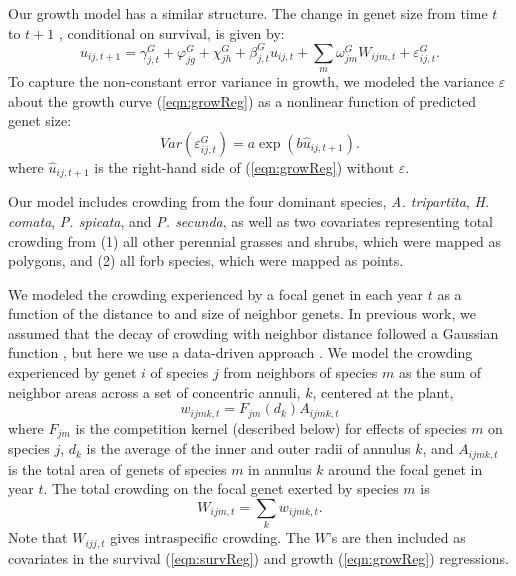 \documentclass[11pt]{article}
\begin{document}
\begin{doublespacing}
Our growth model has a similar structure. The change in genet size from time $t$ to $t+1$ , conditional on survival, is given by:
\begin{equation}
u_{ij,t+1} = \gamma_{j,t}^G + \varphi_{jg}^G+  \chi_{jh}^G  + \beta_{j,t}^G u_{ij,t} + 
\sum \limits_{m} \omega_{jm}^G {W}_{ijm,t} + \varepsilon_{ij,t}^G .
\label{eqn:growReg}
\end{equation}
To capture the non-constant error variance in growth, we modeled the variance $\varepsilon$ about the growth 
curve (\ref{eqn:growReg}) as a nonlinear function of predicted genet size:
\begin{equation}
Var(\varepsilon_{ij,t}^G) = a \exp(b\hat{u}_{ij,t+1}).
\label{eqn:growVar}
\end{equation}
where $\hat{u}_{ij,t+1}$ is the right-hand side of (\ref{eqn:growReg}) without $\varepsilon$. 

Our model includes crowding from the four dominant species, \textit{A. tripartita}, \textit{H. comata}, \textit{P. spicata}, and \textit{P. secunda}, as well as two covariates representing total crowding from (1) all other perennial grasses and shrubs, which were mapped as polygons, and (2) all forb species, which were mapped as points. 

We modeled the crowding experienced by a focal genet in each year $t$ as a function of the distance to and size of neighbor genets. In previous work, 
we assumed that the decay of crowding with neighbor distance followed a Gaussian function \citep{chu_large_2015}, but here we use a data-driven 
approach \citep{teller_linking_2016}. We model the crowding experienced by genet $i$ of species $j$ from neighbors of species $m$ as the sum of neighbor 
areas across a set of concentric annuli, $k$, centered at the plant,
\begin{equation}
w_{ijmk,t} = F_{jm}(d_{k})A_{ijmk,t}     
\label{eqn:wik}
\end{equation}
where $F_{jm}$ is the competition kernel (described below) for effects of species $m$ on species $j$, 
$d_{k}$ is the average of the inner and outer radii of annulus $k$, 
and $A_{ijmk,t}$ is the total area of genets of species $m$ in annulus $k$ around the focal genet in year $t$. The total crowding on 
the focal genet exerted by species $m$ is
\begin{equation}
W_{ijm,t}  =\sum_k {w_{ijmk,t}} .
\label{eqn:wijm}
\end{equation} 
Note that $W_{ijj,t}$ gives intraspecific crowding. The $W$'s are then 
included as covariates in the survival (\ref{eqn:survReg}) and growth (\ref{eqn:growReg}) regressions.


\end{doublespacing}
\end{document}
